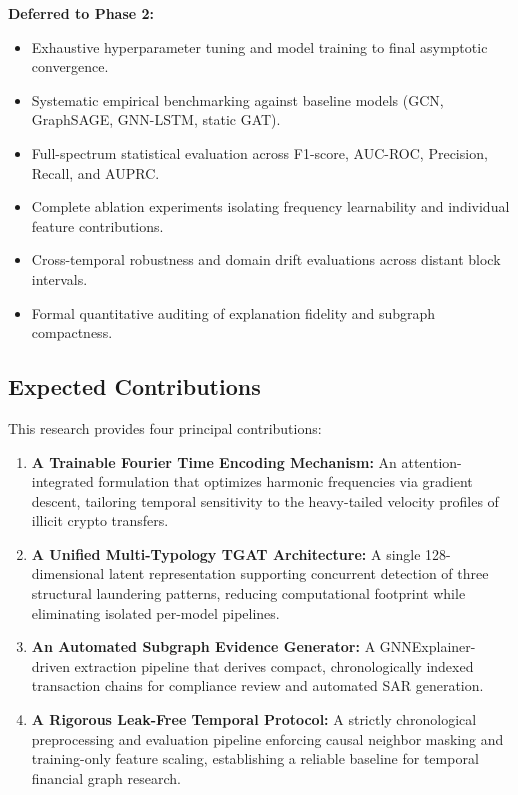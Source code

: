 \textbf{Deferred to Phase 2:}
\begin{itemize}
	\item Exhaustive hyperparameter tuning and model training to final asymptotic convergence.
	\item Systematic empirical benchmarking against baseline models (GCN, GraphSAGE, GNN-LSTM, static GAT).
	\item Full-spectrum statistical evaluation across F1-score, AUC-ROC, Precision, Recall, and AUPRC.
	\item Complete ablation experiments isolating frequency learnability and individual feature contributions.
	\item Cross-temporal robustness and domain drift evaluations across distant block intervals.
	\item Formal quantitative auditing of explanation fidelity and subgraph compactness.
\end{itemize}

\subsection{Expected Contributions}
\label{subsec:contributions}

This research provides four principal contributions:
\begin{enumerate}
	\item \textbf{A Trainable Fourier Time Encoding Mechanism:} An attention-integrated formulation that optimizes harmonic frequencies via gradient descent, tailoring temporal sensitivity to the heavy-tailed velocity profiles of illicit crypto transfers.
	\item \textbf{A Unified Multi-Typology TGAT Architecture:} A single 128-dimensional latent representation supporting concurrent detection of three structural laundering patterns, reducing computational footprint while eliminating isolated per-model pipelines.
	\item \textbf{An Automated Subgraph Evidence Generator:} A GNNExplainer-driven extraction pipeline that derives compact, chronologically indexed transaction chains for compliance review and automated SAR generation.
	\item \textbf{A Rigorous Leak-Free Temporal Protocol:} A strictly chronological preprocessing and evaluation pipeline enforcing causal neighbor masking and training-only feature scaling, establishing a reliable baseline for temporal financial graph research.
\end{enumerate}
